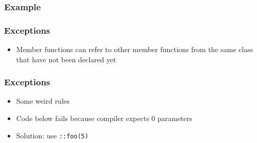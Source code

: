 \documentclass{../ucll-slides}
\begin{document}
\begin{frame}
  \frametitle{Example}
  \begin{overprint}
  \end{overprint}
\end{frame}

\begin{frame}
  \frametitle{Exceptions}
  \begin{itemize}
    \item Member functions can refer to other member functions
          from the same class that have not been declared yet
  \end{itemize}
\end{frame}

\begin{frame}
  \frametitle{Exceptions}
  \begin{itemize}
    \item Some weird rules
    \item Code below fails because compiler expects 0 parameters
    \item Solution: use {\tt ::foo(5)}
  \end{itemize}
\end{frame}

\end{document}
